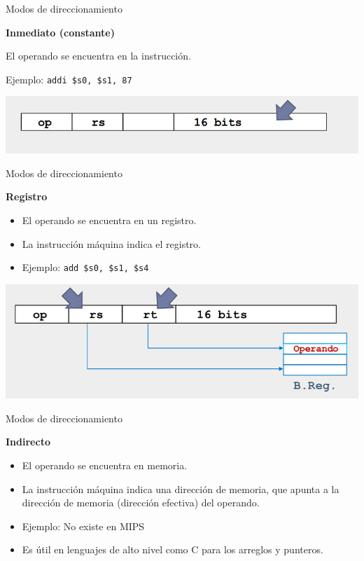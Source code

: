 \documentclass[aspectratio=169,compress]{beamer}
\begin{document}
\begin{footnotesize}
\begin{frame}{Modos de direccionamiento}
\begin{center}\textbf{Inmediato (constante)}\end{center}
El operando se encuentra en la instrucción.

Ejemplo: \texttt{addi \$s0, \$s1, 87} 

	\begin{center}
\includegraphics[scale=0.3]{images/dir-inmediato.jpg} 
	\end{center}
\end{frame}


\begin{frame}{Modos de direccionamiento}
\begin{center}\textbf{Registro}\end{center}

\begin{itemize}
\item El operando se encuentra en un registro.
\item La instrucción máquina indica el registro.
\item Ejemplo: \texttt{add \$s0, \$s1, \$s4} 

\end{itemize}

	\begin{center}
\includegraphics[scale=0.3]{images/dir-registro.jpg} 
	\end{center}
\end{frame}


\begin{frame}{Modos de direccionamiento}
\begin{center}\textbf{Indirecto}\end{center}

\begin{itemize}
\item El operando se encuentra en memoria.
\item La instrucción máquina indica una dirección de memoria, que apunta a la dirección de memoria (dirección efectiva) del operando.
\item Ejemplo: No existe en MIPS
\item Es útil en lenguajes de alto nivel como C para los arreglos y punteros.


\end{itemize}
\end{frame}
\end{footnotesize}
\end{document}
